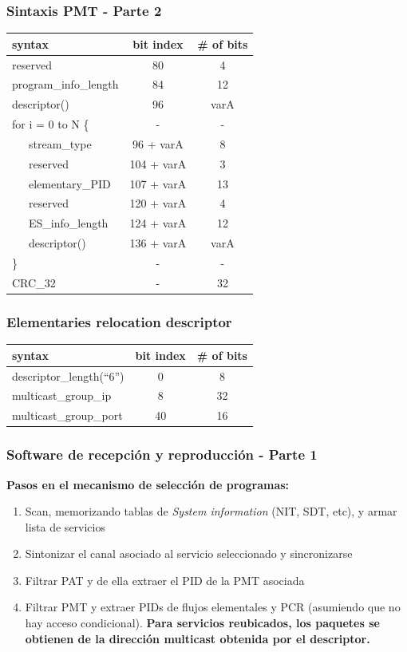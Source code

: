 \documentclass[a4paper,11pt]{beamer}
\newcounter{saveenumi}
\newcommand{\seti}{\setcounter{saveenumi}{\value{enumi}}}
\begin{document}
\begin{frame}
\frametitle{Sintaxis PMT - Parte 2}
\begin{tabular}{ l | c | c }
syntax & bit index & \# of bits \\
\hline 
reserved  & 80  & 4\\
program\_info\_length  & 84  & 12\\
descriptor()  & 96  & varA \\
for i = 0 to N \{& - & -\\
  \ \ \ stream\_type  & 96 + varA  & 8 \\
  \ \ \ reserved  & 104 + varA  & 3 \\
  \ \ \ elementary\_PID  & 107 + varA  & 13 \\
  \ \ \ reserved  & 120 + varA & 4 \\
  \ \ \ ES\_info\_length  & 124 + varA & 12 \\
  \ \ \ descriptor()  & 136 + varA  & varA  \\
\} & - & - \\
CRC\_32  & - & 32 \\
\end{tabular}
\end{frame}


\begin{frame}
\frametitle{Elementaries relocation descriptor}
\begin{tabular}{ l | c | c }
syntax & bit index & \# of bits \\
\hline 
descriptor\_length(``6'')  & 0  & 8 \\
multicast\_group\_ip  & 8  & 32\\
multicast\_group\_port  & 40 & 16 \\

\end{tabular}
\end{frame}

\begin{frame}
\frametitle{Software de recepción y reproducción - Parte 1}
\textbf{Pasos en el mecanismo de selección de programas:}
\begin{enumerate}
\item Scan, memorizando tablas de \emph{System information} (NIT, SDT, etc), y armar lista de servicios
\item Sintonizar el canal asociado al servicio seleccionado y sincronizarse
\item Filtrar PAT y de ella extraer el PID de la PMT asociada
\item Filtrar PMT y extraer PIDs de flujos elementales y PCR (asumiendo que no hay acceso condicional). \textbf{Para servicios reubicados, los paquetes se obtienen de la dirección multicast obtenida por el descriptor.}
\seti
\end{enumerate}
\end{frame}
\end{document}
